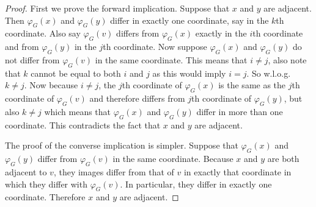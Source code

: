\documentclass[12pt,a4paper,titlepage,openany]{report}
\begin{document}
\begin{proof}
First we prove the forward implication. Suppose that $x$ and $y$ are adjacent. Then $\varphi_G(x)$ and $\varphi_G(y)$ differ in exactly one coordinate, say in the $k$th coordinate. Also say $\varphi_G(v)$ differs from $\varphi_G(x)$ exactly in the $i$th coordinate and from $\varphi_G(y)$ in the $j$th coordinate. Now suppose $\varphi_G(x)$ and $\varphi_G(y)$ do not differ from $\varphi_G(v)$ in the same coordinate. This means that $i\neq j$, also note that $k$ cannot be equal to both $i$ and $j$ as this would imply $i=j$. So w.l.o.g.~$k\neq j$. Now because $i\neq j$, the $j$th coordinate of $\varphi_G(x)$ is the same as the $j$th coordinate of $\varphi_G(v)$ and therefore differs from $j$th coordinate of $\varphi_G(y)$, but also $k\neq j$ which means that $\varphi_G(x)$ and $\varphi_G(y)$ differ in more than one coordinate. This contradicts the fact that $x$ and $y$ are adjacent.

The proof of the converse implication is simpler. Suppose that $\varphi_G(x)$ and $\varphi_G(y)$  differ from $\varphi_G(v)$  in the same coordinate. Because $x$ and $y$ are both adjacent to $v$, they images differ from that of $v$ in exactly that coordinate in which they differ with $\varphi_G(v)$. In particular, they differ in exactly one coordinate. Therefore $x$ and $y$ are adjacent.
\end{proof}
\end{document}
